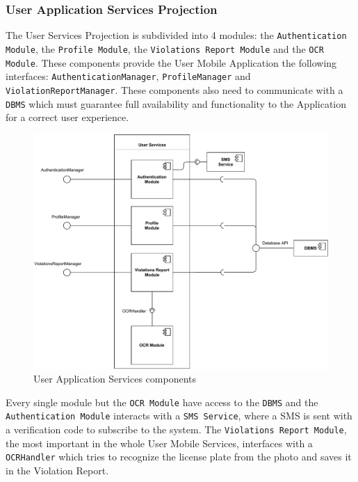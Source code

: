 \documentclass[12pt,a4paper]{article}
\begin{document}
\subsubsection{User Application Services Projection}
The User Services Projection is subdivided into 4 modules: the \texttt{Authentication Module}, the \texttt{Profile Module}, the \texttt{Violations Report Module} and the \texttt{OCR Module}. These components provide the User Mobile Application the following interfaces: \texttt{AuthenticationManager}, \texttt{ProfileManager} and \texttt{ViolationReportManager}. These components also need to communicate with a \texttt{DBMS} which must guarantee full availability and functionality to the Application for a correct user experience.
\begin{figure}[H]
		\centering
		\includegraphics[width=1.2\linewidth]{../assets/images/user_projection.pdf}
		\caption{User Application Services components}
	\end{figure}
Every single module but the \texttt{OCR Module} have access to the \texttt{DBMS} and the \texttt{Authentication Module} interacts with a \texttt{SMS Service}, where a SMS is sent with a verification code to subscribe to the system. The \texttt{Violations Report Module}, the most important in the whole User Mobile Services, interfaces with a \texttt{OCRHandler} which tries to recognize the license plate from the photo and saves it in the Violation Report.
\end{document}
